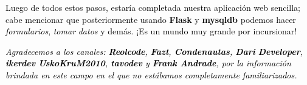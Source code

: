 \documentclass[a4paper]{article}
\begin{document}



\bigskip


\bigskip


\bigskip

{
\textcolor{black}{Luego de todos estos pasos, estaría completada nuestra aplicación web sencilla; cabe mencionar que
posteriormente usando }\textbf{\textcolor{black}{Flask}}\textcolor{black}{ y
}\textbf{\textcolor{black}{mysqldb}}\textcolor{black}{ podemos hacer
}\textit{\textcolor{black}{formularios}}\textcolor{black}{, }\textit{\textcolor{black}{tomar}}\textcolor{black}{
}\textit{\textcolor{black}{datos}}\textcolor{black}{ y demás. ¡Es un mundo muy grande por incursionar!}}

{
\textit{\textcolor{black}{Agradecemos a los canales:
}}\textbf{\textit{\textcolor{black}{Reolcode}}}\textit{\textcolor{black}{,
}}\textbf{\textit{\textcolor{black}{Fazt}}}\textit{\textcolor{black}{,
}}\textbf{\textit{\textcolor{black}{Condenautas}}}\textit{\textcolor{black}{,
}}\textbf{\textit{\textcolor{black}{Dari}}}\textit{\textcolor{black}{
}}\textbf{\textit{\textcolor{black}{Developer}}}\textit{\textcolor{black}{,
}}\textbf{\textit{\textcolor{black}{ikerdev}}}\textit{\textcolor{black}{ \newline
}}\textbf{\textit{\textcolor{black}{UskoKruM2010}}}\textit{\textcolor{black}{,
}}\textbf{\textit{\textcolor{black}{tavodev}}}\textit{\textcolor{black}{ y }}\textbf{\textit{\textcolor{black}{Frank
Andrade}}}\textit{\textcolor{black}{, por la información brindada en este campo en el que no estábamos completamente
familiarizados.}}}


\bigskip
\end{document}
